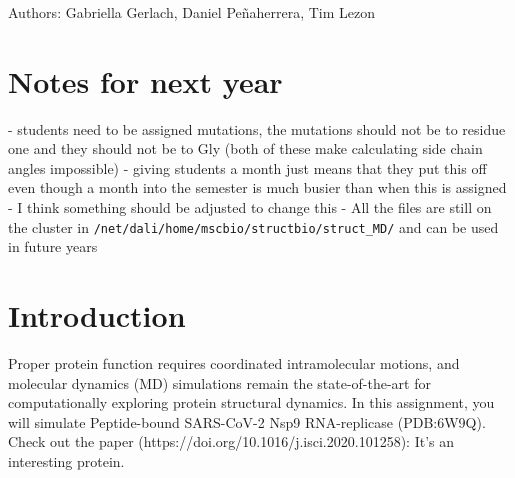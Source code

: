 \documentclass[11pt]{article}
\begin{document}
 \\
 \\
 \\
 \\
\vspace*{12pt}

 \\
\noindent Authors: Gabriella Gerlach, Daniel Pe\~{n}aherrera, Tim Lezon
\vspace{12pt}

\section*{Notes for next year}
- students need to be assigned mutations, the mutations should not be to residue one and they should not be to Gly (both of these make calculating side chain angles impossible) 
- giving students a month just means that they put this off even though a month into the semester is much busier than when this is assigned
- I think something should be adjusted to change this
- All the files are still on the cluster in \texttt{/net/dali/home/mscbio/structbio/struct\_MD/} and can be used in future years


\section*{Introduction}
Proper protein function requires coordinated intramolecular motions, and molecular dynamics (MD) simulations remain the state-of-the-art for computationally exploring protein structural dynamics. In this assignment, you will simulate Peptide-bound SARS-CoV-2 Nsp9 RNA-replicase (PDB:6W9Q). Check out the paper (https://doi.org/10.1016/j.isci.2020.101258): It's an interesting protein. 
\end{document}
